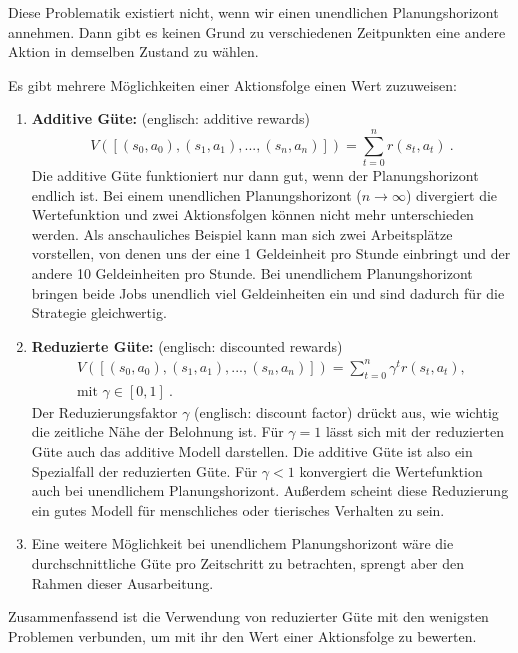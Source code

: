 \documentclass[a4paper]{IEEEtran}
\begin{document}
Diese Problematik existiert nicht, wenn wir einen unendlichen Planungshorizont annehmen. Dann gibt es keinen Grund zu verschiedenen Zeitpunkten eine andere Aktion in demselben Zustand zu wählen.

Es gibt mehrere Möglichkeiten einer Aktionsfolge einen Wert zuzuweisen:
\begin{enumerate}
	\item \textbf{Additive Güte:} (englisch: additive rewards)
		\begin{equation}
			V([ (s_0, a_0), (s_1, a_1), ..., (s_n, a_n)]) = \sum\limits_{t=0}^n r(s_t, a_t)\ .
		\end{equation}
		Die additive Güte funktioniert nur dann gut, wenn der Planungshorizont endlich ist. Bei einem unendlichen Planungshorizont ($n \rightarrow \infty$) divergiert die Wertefunktion und zwei Aktionsfolgen können nicht mehr unterschieden werden. Als anschauliches Beispiel kann man sich zwei Arbeitsplätze vorstellen, von denen uns der eine 1 Geldeinheit pro Stunde einbringt und der andere 10 Geldeinheiten pro Stunde. Bei unendlichem Planungshorizont bringen beide Jobs unendlich viel Geldeinheiten ein und sind dadurch für die Strategie gleichwertig.
	\item \textbf{Reduzierte Güte:} (englisch: discounted rewards)
		\begin{equation}
			\begin{split}
				V([ (s_0, a_0), (s_1, a_1), ..., (s_n, a_n)]) = \sum\limits_{t=0}^n \gamma^t r(s_t, a_t),\\
				\text{mit }\gamma \in [0,1]\ .
			\end{split}
		\end{equation}
		Der Reduzierungsfaktor $\gamma$ (englisch: discount factor) drückt aus, wie wichtig die zeitliche Nähe der Belohnung ist. Für $\gamma=1$ lässt sich mit der reduzierten Güte auch das additive Modell darstellen. Die additive Güte ist also ein Spezialfall der reduzierten Güte. Für $\gamma < 1$ konvergiert die Wertefunktion auch bei unendlichem Planungshorizont. Außerdem scheint diese Reduzierung ein gutes Modell für menschliches oder tierisches Verhalten zu sein.
	\item
		Eine weitere Möglichkeit bei unendlichem Planungshorizont wäre die durchschnittliche Güte pro Zeitschritt zu betrachten, sprengt aber den Rahmen dieser Ausarbeitung.
\end{enumerate}
Zusammenfassend ist die Verwendung von reduzierter Güte mit den wenigsten Problemen verbunden, um mit ihr den Wert einer Aktionsfolge zu bewerten.
\end{document}
